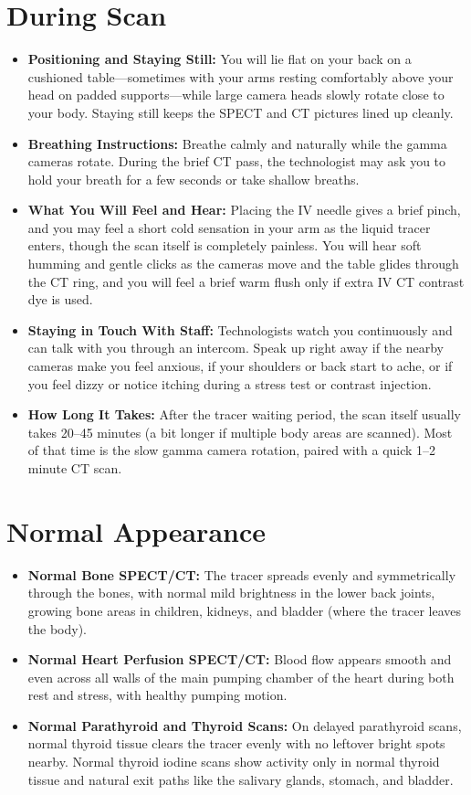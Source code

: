 \section{During Scan}
\begin{itemize}
    \item \textbf{Positioning and Staying Still:} You will lie flat on your back on a cushioned table---sometimes with your arms resting comfortably above your head on padded supports---while large camera heads slowly rotate close to your body. Staying still keeps the SPECT and CT pictures lined up cleanly.
    \item \textbf{Breathing Instructions:} Breathe calmly and naturally while the gamma cameras rotate. During the brief CT pass, the technologist may ask you to hold your breath for a few seconds or take shallow breaths.
    \item \textbf{What You Will Feel and Hear:} Placing the IV needle gives a brief pinch, and you may feel a short cold sensation in your arm as the liquid tracer enters, though the scan itself is completely painless. You will hear soft humming and gentle clicks as the cameras move and the table glides through the CT ring, and you will feel a brief warm flush only if extra IV CT contrast dye is used.
    \item \textbf{Staying in Touch With Staff:} Technologists watch you continuously and can talk with you through an intercom. Speak up right away if the nearby cameras make you feel anxious, if your shoulders or back start to ache, or if you feel dizzy or notice itching during a stress test or contrast injection.
    \item \textbf{How Long It Takes:} After the tracer waiting period, the scan itself usually takes 20--45 minutes (a bit longer if multiple body areas are scanned). Most of that time is the slow gamma camera rotation, paired with a quick 1--2 minute CT scan.
\end{itemize}

\section{Normal Appearance}
\begin{itemize}
    \item \textbf{Normal Bone SPECT/CT:} The tracer spreads evenly and symmetrically through the bones, with normal mild brightness in the lower back joints, growing bone areas in children, kidneys, and bladder (where the tracer leaves the body).
    \item \textbf{Normal Heart Perfusion SPECT/CT:} Blood flow appears smooth and even across all walls of the main pumping chamber of the heart during both rest and stress, with healthy pumping motion.
    \item \textbf{Normal Parathyroid and Thyroid Scans:} On delayed parathyroid scans, normal thyroid tissue clears the tracer evenly with no leftover bright spots nearby. Normal thyroid iodine scans show activity only in normal thyroid tissue and natural exit paths like the salivary glands, stomach, and bladder.
\end{itemize}

